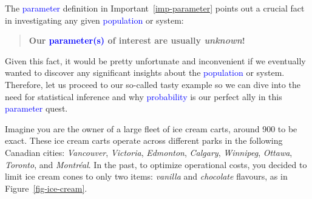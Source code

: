 \documentclass[
  letterpaper,
  DIV=11,
  numbers=noendperiod]{scrreprt}
\begin{document}
The \textcolor{blue}{parameter} definition in
Important~\ref{imp-parameter} points out a crucial fact in investigating
any given \textcolor{blue}{population} or system:

\begin{quote}
\textbf{Our \textcolor{blue}{parameter(s)} of interest are usually
\emph{unknown}!}
\end{quote}

Given this fact, it would be pretty unfortunate and inconvenient if we
eventually wanted to discover any significant insights about the
\textcolor{blue}{population} or system. Therefore, let us proceed to our
so-called tasty example so we can dive into the need for statistical
inference and why \textcolor{blue}{probability} is our perfect ally in
this \textcolor{blue}{parameter} quest.

Imagine you are the owner of a large fleet of ice cream carts, around
900 to be exact. These ice cream carts operate across different parks in
the following Canadian cities: \emph{Vancouver}, \emph{Victoria},
\emph{Edmonton}, \emph{Calgary}, \emph{Winnipeg}, \emph{Ottawa},
\emph{Toronto}, and \emph{Montréal}. In the past, to optimize
operational costs, you decided to limit ice cream cones to only two
items: \emph{vanilla} and \emph{chocolate} flavours, as in
Figure~\ref{fig-ice-cream}.
\end{document}
